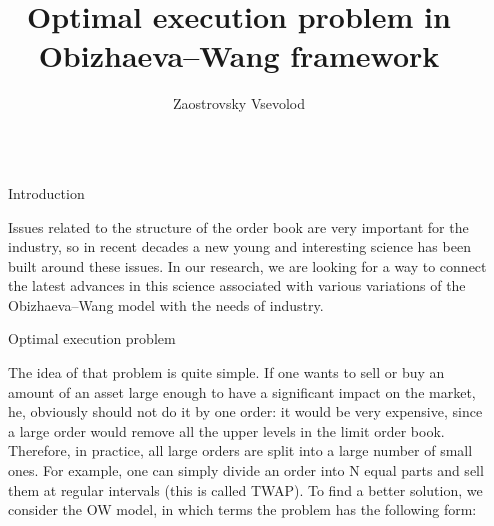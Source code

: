 \documentclass[]{beamer}
\title{Optimal execution problem in Obizhaeva--Wang framework}
\author{Zaostrovsky Vsevolod}
\begin{document}
\nocite{*} %

\begin{frame}[t]
    \begin{columns}[t] %
     
    \begin{column}{\lrmargin}\end{column} %
    
    \begin{column}{\onecolwid} %
     
    
    \begin{block}{Introduction}
    
        Issues related to the structure of the order book are very important for the industry, 
        so in recent decades a new young and interesting science has been built around these issues. In our research, we are looking for a way 
        to connect the latest advances in this science associated with various variations of the Obizhaeva--Wang model with the needs of industry.
    
    \end{block}

    \begin{block}{Optimal execution problem}
    
        The idea of that problem is quite simple. If one wants to sell or buy an amount of an asset large enough to have a significant 
        impact on the market, he, obviously should not do it by one order: it would be very expensive, since a large order 
        would remove all the upper levels in the limit order book. Therefore, in practice, all large orders are split into a large number of small ones. 
        For example, one can simply divide an order into N equal parts and sell them at regular intervals (this is called TWAP). 
        To find a better solution, we consider the OW model, in which terms the problem has the following form: \par  




\end{block}
\end{column}
\end{columns}
\end{frame}
\end{document}
